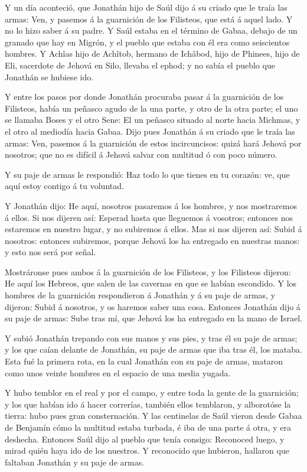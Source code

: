  Y un día aconteció, que Jonathán hijo de Saúl dijo á su
criado que le traía las armas: Ven, y pasemos á la guarnición de los
Filisteos, que está á aquel lado. Y no lo hizo saber á su padre.
 Y Saúl estaba en el término de Gabaa, debajo de un granado
que hay en Migrón, y el pueblo que estaba con él era como seiscientos
hombres.  Y Achîas hijo de Achîtob, hermano de Ichâbod, hijo
de Phinees, hijo de Eli, sacerdote de Jehová en Silo, llevaba el ephod;
y no sabía el pueblo que Jonathán se hubiese ido.

 Y entre los pasos por donde Jonathán procuraba pasar á la
guarnición de los Filisteos, había un peñasco agudo de la una parte, y
otro de la otra parte; el uno se llamaba Boses y el otro Sene:
 El un peñasco situado al norte hacia Michmas, y el otro al
mediodía hacia Gabaa.  Dijo pues Jonathán á su criado que le
traía las armas: Ven, pasemos á la guarnición de estos incircuncisos:
quizá hará Jehová por nosotros; que no es difícil á Jehová salvar con
multitud ó con poco número.

 Y su paje de armas le respondió: Haz todo lo que tienes en
tu corazón: ve, que aquí estoy contigo á tu voluntad.

 Y Jonathán dijo: He aquí, nosotros pasaremos á los hombres,
y nos mostraremos á ellos.  Si nos dijeren así: Esperad
hasta que lleguemos á vosotros; entonces nos estaremos en nuestro lugar,
y no subiremos á ellos.  Mas si nos dijeren así: Subid á
nosotros: entonces subiremos, porque Jehová los ha entregado en nuestras
manos: y esto nos será por señal.

 Mostráronse pues ambos á la guarnición de los Filisteos, y
los Filisteos dijeron: He aquí los Hebreos, que salen de las cavernas en
que se habían escondido.  Y los hombres de la guarnición
respondieron á Jonathán y á su paje de armas, y dijeron: Subid á
nosotros, y os haremos saber una cosa. Entonces Jonathán dijo á su paje
de armas: Sube tras mí, que Jehová los ha entregado en la mano de
Israel.

 Y subió Jonathán trepando con sus manos y sus pies, y tras
él su paje de armas; y los que caían delante de Jonathán, su paje de
armas que iba tras él, los mataba.  Esta fué la primera
rota, en la cual Jonathán con su paje de armas, mataron como unos veinte
hombres en el espacio de una media yugada.

 Y hubo temblor en el real y por el campo, y entre toda la
gente de la guarnición; y los que habían ido á hacer correrías, también
ellos temblaron, y alborotóse la tierra: hubo pues gran consternación.
 Y las centinelas de Saúl vieron desde Gabaa de Benjamín
cómo la multitud estaba turbada, é iba de una parte á otra, y era
deshecha.  Entonces Saúl dijo al pueblo que tenía consigo:
Reconoced luego, y mirad quién haya ido de los nuestros. Y reconocido
que hubieron, hallaron que faltaban Jonathán y su paje de armas.

